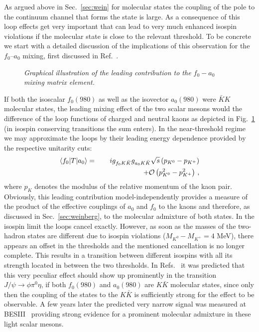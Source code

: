 As argued above in Sec.~\ref{sec:wein} for molecular states the coupling of the
pole to the continuum
channel that forms the
state is large. As a consequence of this loop effects get very important that
can lead to very much
enhanced isospin violations if the molecular state is close to the relevant
threshold.
To be concrete we start with a detailed discussion of the implications of this
observation
for the $f_0$--$a_0$ mixing, first discussed in Ref.~\cite{Achasov:1979xc}.
\begin{figure}[t]
\begin{center}
\caption{\it Graphical illustration of the leading contribution to the $f_0-a_0$
mixing
    matrix element.}
\label{lcsb}
\end{center}
\end{figure}
If both the isoscalar $f_0(980)$ as well as the isovector $a_0(980)$ were $\bar
KK$ molecular
states, the leading mixing effect of the two scalar mesons would the difference
of the loop functions
of charged and neutral kaons as
depicted in Fig.~\ref{lcsb} (in isospin conserving transitions the sum enters).
In the near-threshold regime we may approximate the loops by their leading
energy dependence provided by the respective unitarity cuts:
\begin{eqnarray}\nonumber
\langle f_0 |T| a_0\rangle &=& ig_{f_0K\bar K}g_{a_0K\bar
    K}\sqrt{s}\left( p_{K^0}-p_{K^+} \right) \\ & & \qquad  \qquad  \qquad +
{\cal
    O}\left({p_{K^0}^2-p_{K^+}^2}\right) \, ,
\label{llam}
\end{eqnarray}
where $p_K$ denotes the modulus of the relative momentum of the kaon pair.
Obviously, this leading contribution model-independently provides a measure of
the product of the effective couplings of $a_0$ and $f_0$ to the kaons and
therefore, as discussed in Sec.~\ref{sec:weinberg},   to the molecular admixture
of both states.
In the isospin limit  the loops cancel exactly. However, as soon as the masses
of the two-hadron states are different due to isospin violations
($M_{K^0}-M_{K^+}=4$ MeV), there appears an offset in the thresholds and the
mentioned cancellation is no longer complete.
This results in a transition between different isospins with all its strength
located  in between the two thresholds.
In Refs.~\cite{Wu:2007jh,Hanhart:2007bd} it was predicted that this very
peculiar effect should show up prominently in the transition $J/\psi \to \phi
\pi^0\eta$, if both $f_0(980)$ and $a_0(980)$ are $K\bar K$ molecular states,
since only then the coupling of the states to the $K\bar K$ is sufficiently
strong for the effect to be observable. A few years later the predicted very
narrow signal was measured at BESIII~\cite{Ablikim:2010aa} providing strong
evidence for a prominent molecular admixture in these light scalar mesons.

